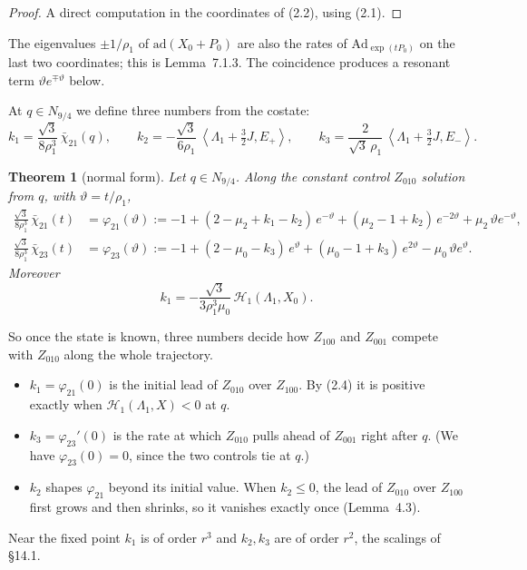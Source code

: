 \documentclass[11pt,a4paper]{article}
\theoremstyle{plain}
\newtheorem{theorem}{Theorem}[section]
\theoremstyle{definition}
\theoremstyle{remark}
\newcommand{\bracks}[2]{\left\langle #1,#2\right\rangle}
\newcommand{\Ad}{\mathrm{Ad}}
\newcommand{\ad}{\mathrm{ad}}
\renewcommand{\H}{\mathcal{H}}
\newcommand{\cl}{\bar\chi}
\begin{document}
\begin{proof}
A direct computation in the coordinates of (2.2), using (2.1).
\end{proof}

The eigenvalues $\pm1/\rho_1$ of $\ad(X_0+P_0)$ are also the rates of $\Ad_{\exp(tP_0)}$ on the
last two coordinates; this is Lemma~7.1.3. The coincidence produces a resonant term
$\vartheta e^{\mp\vartheta}$ below.

At $q\in N_{9/4}$ we define three numbers from the costate:
\begin{equation}\tag{2.3}
k_1=\frac{\sqrt3}{8\rho_1^3}\,\cl_{21}(q),\qquad
k_2=-\frac{\sqrt3}{6\rho_1}\,\bracks{\Lambda_1+\tfrac32J}{E_+},\qquad
k_3=\frac{2}{\sqrt3\,\rho_1}\,\bracks{\Lambda_1+\tfrac32J}{E_-}.
\end{equation}

\begin{theorem}[normal form]
Let $q\in N_{9/4}$. Along the constant control $Z_{010}$ solution from $q$, with
$\vartheta=t/\rho_1$,
\begin{align*}
\frac{\sqrt3}{8\rho_1^3}\,\cl_{21}(t)&=\varphi_{21}(\vartheta):=
-1+(2-\mu_2+k_1-k_2)\,e^{-\vartheta}+(\mu_2-1+k_2)\,e^{-2\vartheta}+\mu_2\,\vartheta e^{-\vartheta},\\
\frac{\sqrt3}{8\rho_1^3}\,\cl_{23}(t)&=\varphi_{23}(\vartheta):=
-1+(2-\mu_0-k_3)\,e^{\vartheta}+(\mu_0-1+k_3)\,e^{2\vartheta}-\mu_0\,\vartheta e^{\vartheta}.
\end{align*}
Moreover
\begin{equation}\tag{2.4}
k_1=-\frac{\sqrt3}{3\rho_1^3\mu_0}\,\H_1(\Lambda_1,X_0).
\end{equation}
\end{theorem}

So once the state is known, three numbers decide how $Z_{100}$ and $Z_{001}$ compete with
$Z_{010}$ along the whole trajectory.
\begin{itemize}[itemsep=1pt]
\item $k_1=\varphi_{21}(0)$ is the initial lead of $Z_{010}$ over $Z_{100}$. By (2.4) it is
positive exactly when $\H_1(\Lambda_1,X)<0$ at $q$.
\item $k_3=\varphi_{23}'(0)$ is the rate at which $Z_{010}$ pulls ahead of $Z_{001}$ right after
$q$. (We have $\varphi_{23}(0)=0$, since the two controls tie at $q$.)
\item $k_2$ shapes $\varphi_{21}$ beyond its initial value. When $k_2\le0$, the lead of $Z_{010}$
over $Z_{100}$ first grows and then shrinks, so it vanishes exactly once (Lemma~4.3).
\end{itemize}
Near the fixed point $k_1$ is of order $r^3$ and $k_2,k_3$ are of order $r^2$, the scalings of
\S14.1.
\end{document}
